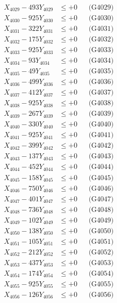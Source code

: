 \documentclass[a4paper,10pt]{article}
\begin{document}
{\begin{align}
X_{4029} - 493Y_{4029} &\leq +0 && \text{(G4029)} \\
X_{4030} - 925Y_{4030} &\leq +0 && \text{(G4030)} \\
\allowbreak
X_{4031} - 322Y_{4031} &\leq +0 && \text{(G4031)} \\
X_{4032} - 175Y_{4032} &\leq +0 && \text{(G4032)} \\
X_{4033} - 925Y_{4033} &\leq +0 && \text{(G4033)} \\
X_{4034} - 93Y_{4034} &\leq +0 && \text{(G4034)} \\
X_{4035} - 49Y_{4035} &\leq +0 && \text{(G4035)} \\
X_{4036} - 499Y_{4036} &\leq +0 && \text{(G4036)} \\
X_{4037} - 412Y_{4037} &\leq +0 && \text{(G4037)} \\
X_{4038} - 925Y_{4038} &\leq +0 && \text{(G4038)} \\
X_{4039} - 267Y_{4039} &\leq +0 && \text{(G4039)} \\
X_{4040} - 330Y_{4040} &\leq +0 && \text{(G4040)} \\
\allowbreak
X_{4041} - 925Y_{4041} &\leq +0 && \text{(G4041)} \\
X_{4042} - 399Y_{4042} &\leq +0 && \text{(G4042)} \\
X_{4043} - 137Y_{4043} &\leq +0 && \text{(G4043)} \\
X_{4044} - 452Y_{4044} &\leq +0 && \text{(G4044)} \\
X_{4045} - 158Y_{4045} &\leq +0 && \text{(G4045)} \\
X_{4046} - 750Y_{4046} &\leq +0 && \text{(G4046)} \\
X_{4047} - 401Y_{4047} &\leq +0 && \text{(G4047)} \\
X_{4048} - 736Y_{4048} &\leq +0 && \text{(G4048)} \\
X_{4049} - 102Y_{4049} &\leq +0 && \text{(G4049)} \\
X_{4050} - 138Y_{4050} &\leq +0 && \text{(G4050)} \\
\allowbreak
X_{4051} - 105Y_{4051} &\leq +0 && \text{(G4051)} \\
X_{4052} - 212Y_{4052} &\leq +0 && \text{(G4052)} \\
X_{4053} - 437Y_{4053} &\leq +0 && \text{(G4053)} \\
X_{4054} - 174Y_{4054} &\leq +0 && \text{(G4054)} \\
X_{4055} - 925Y_{4055} &\leq +0 && \text{(G4055)} \\
X_{4056} - 126Y_{4056} &\leq +0 && \text{(G4056)} \\

\end{align}}
\end{document}
